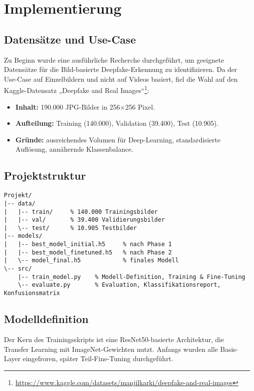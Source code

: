 \chapter{Implementierung}
\label{chap:implementierung}

\section{Datensätze und Use-Case}
Zu Beginn wurde eine ausführliche Recherche durchgeführt, um geeignete Datensätze für die Bild-basierte Deepfake-Erkennung zu identifizieren. Da der Use-Case auf Einzelbildern und nicht auf Videos basiert, fiel die Wahl auf den Kaggle-Datensatz „Deepfake and Real Images“\footnote{\url{https://www.kaggle.com/datasets/manjilkarki/deepfake-and-real-images}}:
\begin{itemize}
  \item \textbf{Inhalt:} 190.000 JPG-Bilder in 256×256 Pixel.
  \item \textbf{Aufteilung:} Training (140.000), Validation (39.400), Test (10.905).
  \item \textbf{Gründe:} ausreichendes Volumen für Deep-Learning, standardisierte Auflösung, annähernde Klassenbalance.
\end{itemize}

\section{Projektstruktur}
\begin{verbatim}
Projekt/
|-- data/
|   |-- train/     % 140.000 Trainingsbilder
|   |-- val/       % 39.400 Validierungsbilder
|   \-- test/      % 10.905 Testbilder
|-- models/
|   |-- best_model_initial.h5     % nach Phase 1
|   |-- best_model_finetuned.h5   % nach Phase 2
|   \-- model_final.h5            % finales Modell
\-- src/
    |-- train_model.py    % Modell-Definition, Training & Fine-Tuning
    \-- evaluate.py       % Evaluation, Klassifikationsreport, Konfusionsmatrix
\end{verbatim}

\section{Modelldefinition}
Der Kern des Trainingsskripts ist eine ResNet50-basierte Architektur, die Transfer Learning mit ImageNet-Gewichten nutzt. Anfangs wurden alle Basis-Layer eingefroren, später Teil-Fine-Tuning durchgeführt.

